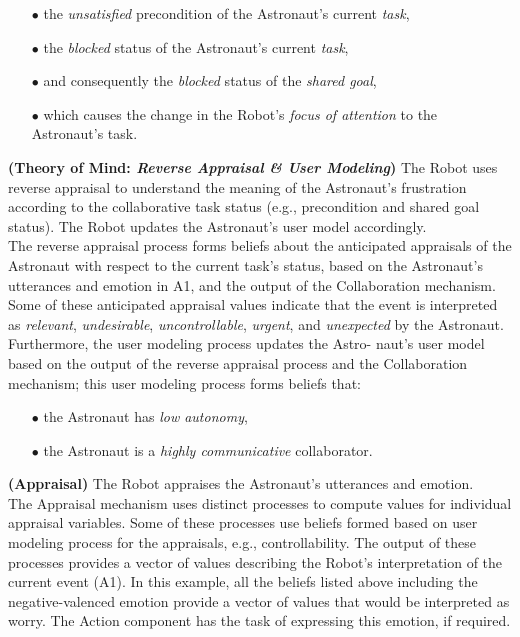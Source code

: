 \begin{itemize}
  \item[$\bullet$] the \textit{unsatisfied} precondition of the Astronaut's
  current \textit{task},
  \item[$\bullet$] the \textit{blocked} status of the Astronaut's current
  \textit{task},
  \item[$\bullet$] and consequently the \textit{blocked} status of the
  \textit{shared goal},
  \item[$\bullet$] which causes the change in the Robot's \textit{focus of
  attention} to the Astronaut's task.
\end{itemize}

\noindent \textbf{(Theory of Mind: \textit{Reverse Appraisal \& User
Modeling})} The Robot uses reverse appraisal to understand the meaning of the
Astronaut's frustration according to the collaborative task status (e.g.,
precondition and shared goal status). The Robot updates the Astronaut's user
model accordingly.\\

The reverse appraisal process forms beliefs about the anticipated appraisals of
the Astronaut with respect to the current task's status, based on the
Astronaut's utterances and emotion in A1, and the output of the Collaboration
mechanism. Some of these anticipated appraisal values indicate that the event is
interpreted as \textit{relevant}, \textit{undesirable}, \textit{uncontrollable},
\textit{urgent}, and \textit{unexpected} by the Astronaut. Furthermore, the user
modeling process updates the Astro- naut’s user model based on the output of the
reverse appraisal process and the Collaboration mechanism; this user modeling
process forms beliefs that:

\begin{itemize}
  \item[$\bullet$] the Astronaut has \textit{low autonomy},
  \item[$\bullet$] the Astronaut is a \textit{highly communicative}
  collaborator.
\end{itemize}

\noindent \textbf{(Appraisal)} The Robot appraises the Astronaut's utterances
and emotion.\\

The Appraisal mechanism uses distinct processes to compute values for individual
appraisal variables. Some of these processes use beliefs formed based on user
modeling process for the appraisals, e.g., controllability. The output of these
processes provides a vector of values describing the Robot's interpretation of
the current event (A1). In this example, all the beliefs listed above including
the negative-valenced emotion provide a vector of values that would be
interpreted as worry. The Action component has the task of expressing this
emotion, if required.\\

